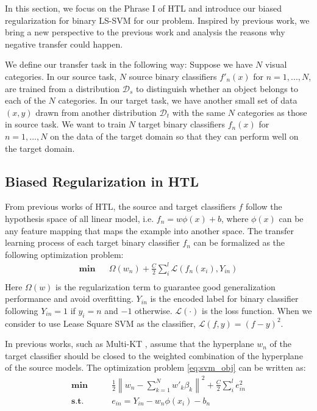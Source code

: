 In this section, we focus on the Phrase I of HTL and introduce our biased regularization for binary LS-SVM for our problem. Inspired by previous work, we bring a new perspective to the previous work and analysis the reasons why negative transfer could happen.

We define our transfer task in the following way: Suppose we have $N$ visual categories. 
In our source task, $N$ source binary classifiers $f'_n(x)$ for $n=1,...,N$, are trained from a distribution $\mathcal{D}_s$ to distinguish whether an object belongs to each of the $N$ categories. In our target task, we have another small set of data $(x,y)$ drawn from another distribution $\mathcal{D}_t$ with the same $N$ categories as those in source task. We want to train $N$ target binary classifiers $f_n(x)$ for $n=1,...,N$ on the data of the target domain so that they can perform well on the target domain.

\subsection{Biased Regularization in HTL}
From previous works of HTL, the source and target classifiers $f$ follow the hypothesis space of all linear model, i.e. $f_n = w\phi(x)+b$, where $\phi(x)$ can be any feature mapping that maps the example into another space. The transfer learning process of each target binary classifier $f_n$ can be formalized as the following optimization problem:
\begin{equation}\label{eq:svm_obj}
\begin{aligned}
\textbf{min} && \Omega({w_n}) + \frac{C}{2}\sum\limits_i^l {\mathcal{L}(f_n(x_i),Y_{in})} \\
\end{aligned}
\end{equation}
Here $\Omega({w})$ is the regularization term to guarantee good generalization performance and avoid overfitting. $Y_{in}$ is the encoded label for binary classifier following $Y_{in}=1$ if $y_i=n$ and $-1$ otherwise. $\mathcal{L}(\cdot)$ is the loss function. When we consider to use Lease Square SVM as the classifier, $\mathcal{L}(f,y) = (f-y)^2$. 

In previous works, such as Multi-KT \cite{tommasi2014learning} , assume that the hyperplane $w_n$ of the target classifier should be closed to the weighted combination of the hyperplane of the source models. The optimization problem \eqref{eq:svm_obj} can be written as:
\begin{equation}\label{eq:opt}
\begin{aligned}
\textbf{min} \qquad & \frac{1}{2}{\left\| {{w_{n}} - \sum\limits_{k = 1}^N {w{'_k}{\beta _k}} } \right\|^2} + \frac{C}{2}\sum\limits_i^l {{e_{in} ^2}}\\
\textbf{s.t.} \qquad &  e_{in} = Y_{in}-w_n\phi(x_i)-b_n
\end{aligned}
\end{equation}

